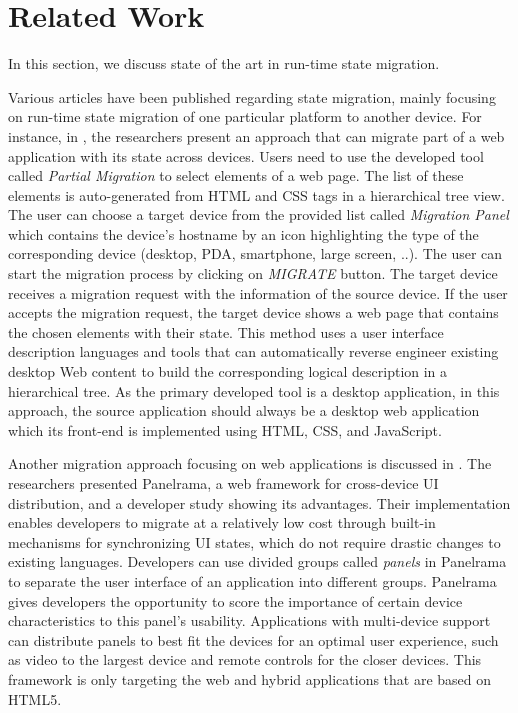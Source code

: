 \chapter{Related Work}
In this section, we discuss state of the art in run-time state migration.
\label{ch:related}

Various articles have been published regarding state migration, mainly focusing on run-time state migration of one particular platform to another device. For instance, in \cite{r1-10.1145/1851600.1851653}, the researchers present an approach that can migrate part of a web application with its state across devices. Users need to use the developed tool called \textit{Partial Migration} to select elements of a web page. The list of these elements is auto-generated from HTML and CSS tags in a hierarchical tree view. The user can choose a target device from the provided list called \textit{Migration Panel} which contains the device’s hostname by an icon highlighting the type of the corresponding device (desktop, PDA, smartphone, large screen, ..). The user can start the migration process by clicking on \textit{MIGRATE} button. The target device receives a migration request with the information of the source device. If the user accepts the migration request, the target device shows a web page that contains the chosen elements with their state. This method uses a user interface description languages \cite{r5-maria-10.1145/1614390.1614394} and tools that can automatically reverse engineer existing desktop Web content to build the corresponding logical description in a hierarchical tree. As the primary developed tool is a desktop application, in this approach, the source application should always be a desktop web application which its front-end is implemented using HTML, CSS, and JavaScript.

Another migration approach focusing on web applications is discussed in \cite{r2-zaplata}. The researchers presented Panelrama, a web framework for cross-device UI distribution, and a developer study showing its advantages. Their implementation enables developers to migrate at a relatively low cost through built-in mechanisms for synchronizing UI states, which do not require drastic changes to existing languages. Developers can use divided groups called \textit{panels} in Panelrama to separate the user interface of an application into different groups. Panelrama gives developers the opportunity to score the importance of certain device characteristics to this panel’s usability. Applications with multi-device support can distribute panels to best fit the devices for an optimal user experience, such as video to the largest device and remote controls for the closer devices. This framework is only targeting the web and hybrid applications that are based on HTML5.

